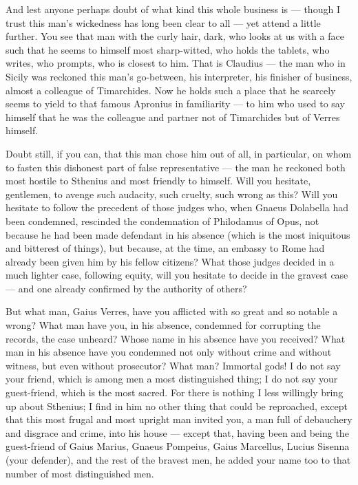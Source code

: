  And lest anyone perhaps doubt of what kind this whole business is --- though I trust this man's wickedness has long been clear to all --- yet attend a little further. You see that man with the curly hair, dark, who looks at us with a face such that he seems to himself most sharp-witted, who holds the tablets, who writes, who prompts, who is closest to him. That is Claudius --- the man who in Sicily was reckoned this man's go-between, his interpreter, his finisher of business, almost a colleague of Timarchides. Now he holds such a place that he scarcely seems to yield to that famous Apronius in familiarity --- to him who used to say himself that he was the colleague and partner not of Timarchides but of Verres himself.

 Doubt still, if you can, that this man chose him out of all, in particular, on whom to fasten this dishonest part of false representative --- the man he reckoned both most hostile to Sthenius and most friendly to himself. Will you hesitate, gentlemen, to avenge such audacity, such cruelty, such wrong as this? Will you hesitate to follow the precedent of those judges who, when Gnaeus Dolabella had been condemned, rescinded the condemnation of Philodamus of Opus, not because he had been made defendant in his absence (which is the most iniquitous and bitterest of things), but because, at the time, an embassy to Rome had already been given him by his fellow citizens? What those judges decided in a much lighter case, following equity, will you hesitate to decide in the gravest case --- and one already confirmed by the authority of others?

 But what man, Gaius Verres, have you afflicted with so great and so notable a wrong? What man have you, in his absence, condemned for corrupting the records, the case unheard? Whose name in his absence have you received? What man in his absence have you condemned not only without crime and without witness, but even without prosecutor? What man? Immortal gods! I do not say your friend, which is among men a most distinguished thing; I do not say your guest-friend, which is the most sacred. For there is nothing I less willingly bring up about Sthenius; I find in him no other thing that could be reproached, except that this most frugal and most upright man invited you, a man full of debauchery and disgrace and crime, into his house --- except that, having been and being the guest-friend of Gaius Marius, Gnaeus Pompeius, Gaius Marcellus, Lucius Sisenna (your defender), and the rest of the bravest men, he added your name too to that number of most distinguished men.

